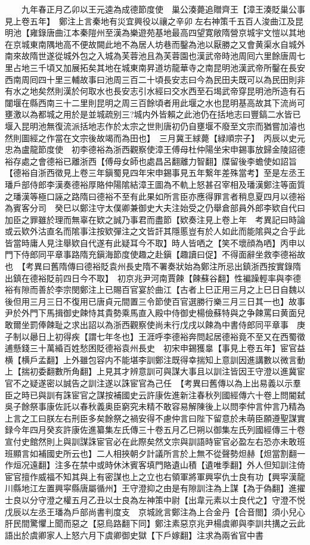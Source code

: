 　　九年春正月乙卯以王元逵為成德節度使　巢公湊薨追贈齊王【漳王湊貶巢公事見上卷五年】　鄭注上言秦地有災宜興役以禳之辛卯左右神策千五百人浚曲江及昆明池【雍錄唐曲江本秦隑州至漢為樂遊苑基地最高四望寛敞隋營京城宇文愷以其地在京城東南隅地高不便故闕此地不為居人坊巷而鑿為池以厭勝之又會黄渠水自城外南來故隋世遂從城外包之入城為芙蓉池且為芙蓉園也漢武帝時池周囘六里餘唐周七里占地三千頃又加展拓矣其地在城東南昇道坊龍華寺之南昆明池漢武帝所鑿在長安西南周囘四十里三輔故事曰池周三百二十頃長安志曰今為民田夫既可以為民田則非有水之地矣然則漢於何取水也長安志引水經曰交水西至石堨武帝穿昆明池所造有石闥堰在縣西南三十二里則昆明之周三百餘頃者用此堰之水也昆明基高故其下流尚可壅激以為都城之用於是並城疏别三?城内外皆賴之此池仍在括地志曰豐鎬二水皆已堰入昆明池無復流派括地志作於太宗之世則唐初仍自壅堰不廢至文宗而猶嘗加濬也然則圖經之作當在文宗後故竭而為田也】　三月冀王絿薨【緑順宗子】　丙辰以史元忠為盧龍節度使　初李德裕為浙西觀察使漳王傅母杜仲陽坐宋申錫事放歸金陵詔德裕存處之會德裕已離浙西【傅母女師也處昌呂翻離力智翻】牒留後李蟾使如詔旨【德裕自浙西徵見上卷三年鎭蜀見四年宋申錫事見五年繋年差殊當考】至是左丞王璠戶部侍郎李漢奏德裕厚賂仲陽隂結漳王圖為不軌上怒甚召宰相及璠漢鄭注等面質之璠漢等極口誣之路隋曰德裕不至有此果如所言臣亦應得罪言者稍息夏四月以德裕為賓客分司　癸巳以鄭注守太僕卿兼御史大夫注始受之仍舉倉部員外郎李欵自代曰加臣之罪雖於理而無辜在欵之誠乃事君而盡節【欵奏注見上卷上年　考異記曰時論或云欵外沽直名而隂事注按欵彈注之文皆訐其隱慝豈有於人如此而能隂與之合乎此皆當時庸人見注舉欵自代遂有此疑耳今不取】時人皆哂之【笑不壞顔為哂】丙申以門下侍郎同平章事路隋充鎭海節度使趣之赴鎭【趣讀曰促】不得面辭坐救李德裕故也　【考異曰舊隋傳曰德裕貶袁州長史隋不署奏狀始為鄭注所忌出鎮浙西按實錄隋出鎮在德裕貶前四日今不取】　初京兆尹河南賈餗【餗蘇谷翻】性褊躁輕率與李德裕有隙而善於李宗閔鄭注上已賜百官宴於曲江【古者上巳正用三月之上巳日自魏以後但用三月三日不復用已唐貞元間置三令節使百官選勝行樂三月三日其一也】故事尹於外門下馬揖御史餗恃其貴勢乘馬直入殿中侍御史楊儉蘇特與之争餗罵曰黄面兒敢爾坐罰俸餗耻之求出詔以為浙西觀察使尚未行戊戌以餗為中書侍郎同平章事　庚子制以曏日上初得疾【謂七年冬也】王涯呼李德裕奔問起居德裕竟不至又在西蜀徵逋懸錢三十萬緍百姓愁困貶德裕袁州長史　初宋申錫獲辠【事見上卷五年】宦官益横【横戶孟翻】上外雖包容内不能堪李訓鄭注既得幸揣知上意訓因進講數以微言動上【揣初委翻數所角翻】上見其才辨意訓可與謀大事且以訓注皆因王守澄以進冀宦官不之疑遂密以誠告之訓注遂以誅宦官為己任　【考異曰舊傳以為上出易義以示羣臣之時已與訓有誅宦官之謀按補國史云許康佐進新注春秋列國經傳六十卷上問閽弑吳子餘祭事康佐託以春秋義奥臣窮究未精不敢容易解陳後上以問李仲言仲言乃精為上言之工曰朕左右刑臣多矣餘祭之禍安得不慮仲言曰陛下留意於未萌臣願遵聖謀實録今年四月癸亥許康佐進纂集左氏傳三十卷五月乙巳朔以御集左氏列國經傳三十卷宣付史館然則上與訓謀誅宦官必在此際矣然文宗與訓語時宦官必盈左右恐亦未敢班班顯言如補國史所云也】二人相挾朝夕計議所言於上無不從聲勢炟赫【炟當割翻一作烜况遠翻】注多在禁中或時休沐賓客填門賂遺山積【遺唯季翻】外人但知訓注倚宦官擅作威福不知其與上有密謀也上之立也右領軍將軍興寜仇士良有功【興寜漢龍川縣地江左置興寜縣唐屬循州】王守澄抑之由是有隙訓注為上謀【為于偽翻】進擢士良以分守澄之權五月乙丑以士良為左神策中尉【出韋元素以士良代之】守澄不悦　戊辰以左丞王璠為戶部尚書判度支　京城訛言鄭注為上合金丹【合音閤】須小兒心肝民間驚懼上聞而惡之【惡烏路翻下同】鄭注素惡京兆尹楊虞卿與李訓共搆之云此語出於虞卿家人上怒六月下虞卿御史獄【下戶嫁翻】注求為兩省官中書